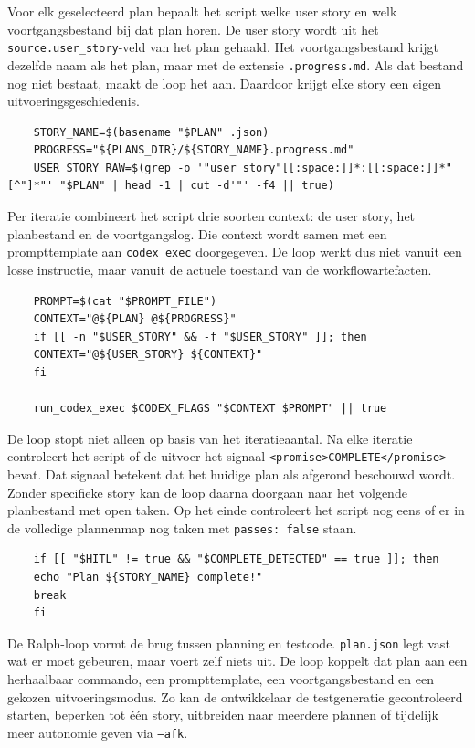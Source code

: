 Voor elk geselecteerd plan bepaalt het script welke user story en welk voortgangsbestand bij dat plan horen. De user story wordt uit het \texttt{source.user\_story}-veld van het plan gehaald. Het voortgangsbestand krijgt dezelfde naam als het plan, maar met de extensie \texttt{.progress.md}. Als dat bestand nog niet bestaat, maakt de loop het aan. Daardoor krijgt elke story een eigen uitvoeringsgeschiedenis.

\begin{verbatim}
    STORY_NAME=$(basename "$PLAN" .json)
    PROGRESS="${PLANS_DIR}/${STORY_NAME}.progress.md"
    USER_STORY_RAW=$(grep -o '"user_story"[[:space:]]*:[[:space:]]*"[^"]*"' "$PLAN" | head -1 | cut -d'"' -f4 || true)
\end{verbatim}

Per iteratie combineert het script drie soorten context: de user story, het planbestand en de voortgangslog. Die context wordt samen met een prompttemplate aan \texttt{codex exec} doorgegeven. De loop werkt dus niet vanuit een losse instructie, maar vanuit de actuele toestand van de workflowartefacten.

\begin{verbatim}
    PROMPT=$(cat "$PROMPT_FILE")
    CONTEXT="@${PLAN} @${PROGRESS}"
    if [[ -n "$USER_STORY" && -f "$USER_STORY" ]]; then
    CONTEXT="@${USER_STORY} ${CONTEXT}"
    fi
    
    run_codex_exec $CODEX_FLAGS "$CONTEXT $PROMPT" || true
\end{verbatim}

De loop stopt niet alleen op basis van het iteratieaantal. Na elke iteratie controleert het script of de uitvoer het signaal \texttt{<promise>COMPLETE</promise>} bevat. Dat signaal betekent dat het huidige plan als afgerond beschouwd wordt. Zonder specifieke story kan de loop daarna doorgaan naar het volgende planbestand met open taken. Op het einde controleert het script nog eens of er in de volledige plannenmap nog taken met \texttt{passes: false} staan.

\begin{verbatim}
    if [[ "$HITL" != true && "$COMPLETE_DETECTED" == true ]]; then
    echo "Plan ${STORY_NAME} complete!"
    break
    fi
\end{verbatim}

De Ralph-loop vormt de brug tussen planning en testcode. \texttt{plan.json} legt vast wat er moet gebeuren, maar voert zelf niets uit. De loop koppelt dat plan aan een herhaalbaar commando, een prompttemplate, een voortgangsbestand en een gekozen uitvoeringsmodus. Zo kan de ontwikkelaar de testgeneratie gecontroleerd starten, beperken tot één story, uitbreiden naar meerdere plannen of tijdelijk meer autonomie geven via \texttt{--afk}.


